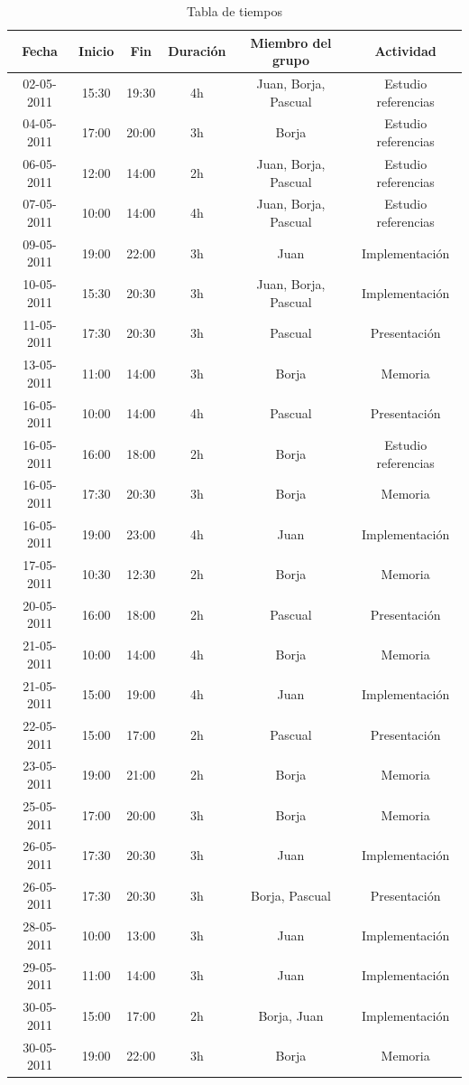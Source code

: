 \documentclass[12pt]{article}
\begin{document}
\begin{table}[h]

\centering
\begin{tabular}{|c|c|c|c|c|c|}
\hline Fecha & Inicio & Fin & Duración & Miembro del grupo & Actividad  \\ 
\hline 02-05-2011 & 15:30 & 19:30 & 4h & Juan, Borja, Pascual & Estudio referencias  \\
\hline 04-05-2011 & 17:00 & 20:00 & 3h & Borja & Estudio referencias  \\
\hline 06-05-2011 & 12:00 & 14:00 & 2h & Juan, Borja, Pascual & Estudio referencias  \\
\hline 07-05-2011 & 10:00 & 14:00 & 4h & Juan, Borja, Pascual & Estudio referencias  \\
\hline 09-05-2011 & 19:00 & 22:00 & 3h & Juan & Implementación  \\
\hline 10-05-2011 & 15:30 & 20:30 & 3h & Juan, Borja, Pascual & Implementación \\
\hline 11-05-2011 & 17:30 & 20:30 & 3h & Pascual & Presentación \\
\hline 13-05-2011 & 11:00 & 14:00 & 3h & Borja & Memoria \\
\hline 16-05-2011 & 10:00 & 14:00 & 4h & Pascual & Presentación \\
\hline 16-05-2011 & 16:00 & 18:00 & 2h & Borja & Estudio referencias \\
\hline 16-05-2011 & 17:30 & 20:30 & 3h & Borja & Memoria \\
\hline 16-05-2011 & 19:00 & 23:00 & 4h & Juan & Implementación \\
\hline 17-05-2011 & 10:30 & 12:30 & 2h & Borja & Memoria \\
\hline 20-05-2011 & 16:00 & 18:00 & 2h & Pascual & Presentación \\
\hline 21-05-2011 & 10:00 & 14:00 & 4h & Borja & Memoria \\
\hline 21-05-2011 & 15:00 & 19:00 & 4h & Juan & Implementación \\
\hline 22-05-2011 & 15:00 & 17:00 & 2h & Pascual & Presentación \\
\hline 23-05-2011 & 19:00 & 21:00 & 2h & Borja & Memoria \\
\hline 25-05-2011 & 17:00 & 20:00 & 3h & Borja & Memoria \\
\hline 26-05-2011 & 17:30 & 20:30 & 3h & Juan & Implementación \\
\hline 26-05-2011 & 17:30 & 20:30 & 3h & Borja, Pascual & Presentación \\
\hline 28-05-2011 & 10:00 & 13:00 & 3h & Juan & Implementación \\
\hline 29-05-2011 & 11:00 & 14:00 & 3h & Juan & Implementación \\
\hline 30-05-2011 & 15:00 & 17:00 & 2h & Borja, Juan & Implementación \\
\hline 30-05-2011 & 19:00 & 22:00 & 3h & Borja & Memoria \\
\hline 
\end{tabular}

\caption{Tabla de tiempos}
\end{table}
\end{document}
